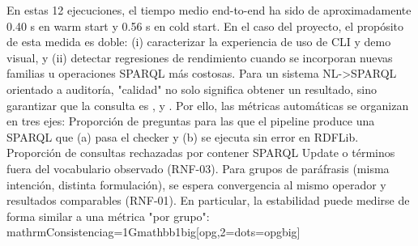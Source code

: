 {}En estas 12 ejecuciones, el tiempo medio end-to-end ha sido de aproximadamente 0.40 s en warm start y 0.56 s en cold start.\markdownRendererInterblockSeparator
{}En el caso del proyecto, el propósito de esta medida es doble: (i) caracterizar la experiencia de uso de CLI y demo visual, y (ii) detectar regresiones de rendimiento cuando se incorporan nuevas familias u operaciones SPARQL más costosas.\markdownRendererInterblockSeparator
{}\markdownRendererInterblockSeparator
{}Para un sistema NL->SPARQL orientado a auditoría, "calidad" no solo significa obtener un resultado, sino garantizar que la consulta es ,  y . Por ello, las métricas automáticas se organizan en tres ejes:\markdownRendererInterblockSeparator
{}\markdownRendererUlBeginTight
\markdownRendererUlItem {} Proporción de preguntas para las que el pipeline produce una SPARQL que (a) pasa el checker y (b) se ejecuta sin error en RDFLib.\markdownRendererUlItemEnd 
\markdownRendererUlItem {} Proporción de consultas rechazadas por contener SPARQL Update o términos fuera del vocabulario observado (RNF-03).\markdownRendererUlItemEnd 
\markdownRendererUlItem {} Para grupos de paráfrasis (misma intención, distinta formulación), se espera convergencia al mismo operador y resultados comparables (RNF-01).\markdownRendererUlItemEnd 
\markdownRendererUlEndTight \markdownRendererInterblockSeparator
{}En particular, la estabilidad puede medirse de forma similar a una métrica "por grupo":\markdownRendererInterblockSeparator
{}\markdownRendererDollarSign{}\markdownRendererDollarSign{} \markdownRendererBackslash{}mathrm\markdownRendererLeftBrace{}Consistencia\markdownRendererRightBrace{}\markdownRendererLeftBrace{}g=1\markdownRendererRightBrace{}\markdownRendererCircumflex{}\markdownRendererLeftBrace{}G\markdownRendererRightBrace{}\markdownRendererBackslash{}mathbb\markdownRendererLeftBrace{}1\markdownRendererRightBrace{}\markdownRendererBackslash{}big[op\markdownRendererLeftBrace{}g,2\markdownRendererRightBrace{}=\markdownRendererBackslash{}dots=opg\markdownRendererRightBrace{}\markdownRendererBackslash{}big] \markdownRendererDollarSign{}\markdownRendererDollarSign{}\markdownRendererInterblockSeparator
